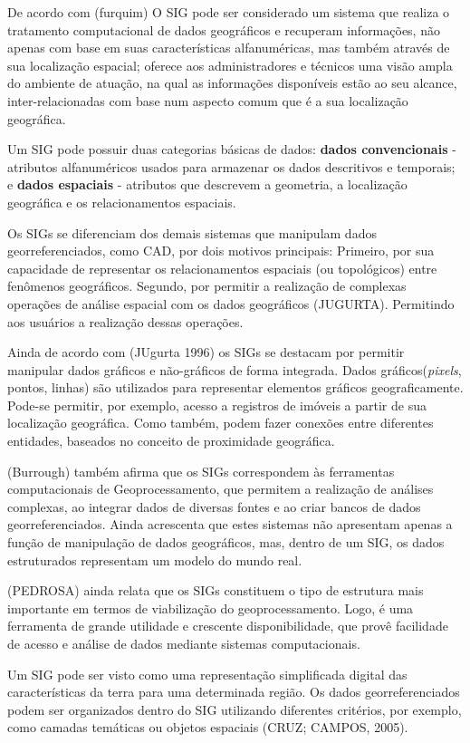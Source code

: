 \documentclass[
	12pt,				%
    oneside,			%
	a4paper,			%
	english,			%
	french,				%
	spanish,			%
	brazil,				%
	]{abntex2}
\begin{document}
De acordo com (furquim) O SIG pode ser considerado um sistema que realiza o tratamento computacional de dados geográficos e recuperam informações, não apenas com base em suas características alfanuméricas, mas também através de sua localização espacial; oferece aos administradores e técnicos uma visão ampla do ambiente de atuação, na qual as informações disponíveis estão ao seu alcance, inter-relacionadas com base num aspecto comum que é a sua localização geográfica. 

Um SIG pode possuir duas categorias básicas de dados: \textbf{dados convencionais} - atributos alfanuméricos usados para armazenar os dados descritivos e temporais; e \textbf{dados espaciais} - atributos que descrevem a geometria, a localização geográfica e os relacionamentos espaciais. 

Os SIGs se diferenciam dos demais sistemas que manipulam dados georreferenciados, como CAD, por dois motivos principais: Primeiro, por sua capacidade de representar os relacionamentos espaciais (ou topológicos) entre fenômenos geográficos. Segundo, por permitir a realização de complexas operações de análise espacial com os dados geográficos (JUGURTA). Permitindo aos usuários a realização dessas operações.

Ainda de acordo com (JUgurta 1996) os SIGs se destacam por permitir manipular dados gráficos e não-gráficos de forma integrada. Dados gráficos(\textit{pixels}, pontos, linhas) são utilizados para representar elementos gráficos geograficamente. Pode-se permitir, por exemplo, acesso a registros de imóveis a partir de sua localização geográfica. Como também, podem fazer conexões entre diferentes entidades, baseados no conceito de proximidade geográfica.
 
(Burrough) também afirma que os SIGs correspondem às ferramentas computacionais de Geoprocessamento, que permitem a realização de análises complexas, ao integrar dados de diversas fontes e ao criar bancos de dados georreferenciados. Ainda acrescenta que estes sistemas não apresentam apenas a função de manipulação de dados geográficos, mas, dentro de um SIG, os dados estruturados representam um modelo do mundo real.

(PEDROSA) ainda relata que os SIGs constituem o tipo de estrutura mais importante em termos de viabilização do geoprocessamento. Logo, é uma ferramenta de grande utilidade e crescente disponibilidade, que provê facilidade de acesso e análise de dados mediante sistemas computacionais. 

Um SIG pode ser visto como uma representação simplificada digital das características da terra para uma determinada região. Os dados georreferenciados podem ser organizados dentro do SIG utilizando diferentes critérios, por exemplo, como camadas temáticas ou objetos espaciais (CRUZ; CAMPOS, 2005).
\end{document}
